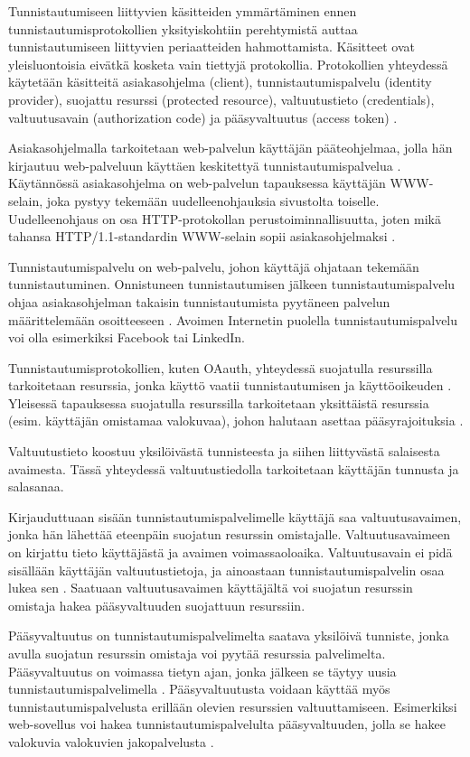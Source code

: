 Tunnistautumiseen liittyvien käsitteiden ymmärtäminen ennen tunnistautumisprotokollien yksityiskohtiin perehtymistä auttaa tunnistautumiseen liittyvien periaatteiden hahmottamista. Käsitteet ovat yleisluontoisia eivätkä kosketa vain tiettyjä protokollia. Protokollien yhteydessä käytetään käsitteitä asiakasohjelma (client), tunnistautumispalvelu (identity provider), suojattu resurssi (protected resource), valtuutustieto (credentials), valtuutusavain (authorization code) ja pääsyvaltuutus (access token) \cite{nisti}.

Asiakasohjelmalla tarkoitetaan web-palvelun käyttäjän pääteohjelmaa, jolla hän kirjautuu web-palveluun käyttäen keskitettyä tunnistautumispalvelua \cite{nisti}. Käytännössä asiakasohjelma on web-palvelun tapauksessa käyttäjän WWW-selain, joka pystyy tekemään uudelleenohjauksia sivustolta toiselle. Uudelleenohjaus on osa HTTP-pro\-to\-kol\-lan perustoiminnallisuutta, joten mikä tahansa HTTP/1.1-stan\-dar\-din WWW-\-se\-lain sopii asiakasohjelmaksi \cite{rfc2616}.

Tunnistautumispalvelu on web-palvelu, johon käyttäjä ohjataan tekemään tunnistautuminen. Onnistuneen tunnistautumisen jälkeen tunnistautumispalvelu ohjaa asi\-a\-kas\-oh\-jel\-man takaisin tunnistautumista pyytäneen palvelun määrittelemään osoitteeseen \cite{nisti}. Avoimen Internetin puolella tunnistautumispalvelu voi olla esimerkiksi Facebook tai LinkedIn.

Tunnistautumisprotokollien, kuten OAauth, yhteydessä suojatulla resurssilla tarkoitetaan resurssia, jonka käyttö vaatii tunnistautumisen ja käyttöoikeuden \cite{oauth2_0}. Yleisessä tapauksessa suojatulla resurssilla tarkoitetaan yksittäistä resurssia (esim. käyttäjän omistamaa valokuvaa), johon halutaan asettaa pääsyrajoituksia \cite{nisti}.

Valtuutustieto koostuu yksilöivästä tunnisteesta ja siihen liittyvästä salaisesta avaimesta. Tässä yhteydessä valtuutustiedolla tarkoitetaan käyttäjän tunnusta ja salasanaa.

Kirjauduttuaan sisään tunnistautumispalvelimelle käyttäjä saa valtuutusavaimen, jonka hän lähettää eteenpäin suojatun resurssin omistajalle. Valtuutusavaimeen on kirjattu tieto käyttäjästä ja avaimen voimassaoloaika. Valtuutusavain ei pidä sisällään käyttäjän valtuutustietoja, ja ainoastaan tunnistautumispalvelin osaa lukea sen \cite{nisti}. Saatuaan valtuutusavaimen käyttäjältä voi suojatun resurssin omistaja hakea pääsyvaltuuden suojattuun resurssiin.

Pääsyvaltuutus on tunnistautumispalvelimelta saatava yksilöivä tunniste, jonka avulla suojatun resurssin omistaja voi pyytää resurssia palvelimelta. Pääsyvaltuutus on voimassa tietyn ajan, jonka jälkeen se täytyy uusia tunnistautumispalvelimella \cite{nisti}. Pääsyvaltuutusta voidaan käyttää myös tunnistautumispalvelusta erillään olevien resurssien valtuuttamiseen. Esimerkiksi web-sovellus voi hakea tunnistautumispalvelulta pääsyvaltuuden, jolla se hakee valokuvia valokuvien jakopalvelusta \cite{facebook}.